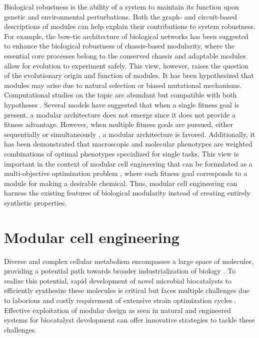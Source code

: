 Biological robustness is the ability of a system to maintain its function upon genetic and environmental perturbations.
Both the graph- and circuit-based descriptions of modules \citep{whitacre2012} can help explain their contributions to system robustness.
For example, the bow-tie architecture of biological networks \citep{friedlander2015} has been suggested \citep{kitano2004} to enhance the biological robustness of chassis-based modularity, where the essential core processes belong to the conserved chassis and adaptable modules allow for evolution to experiment safely.
This view, however, raises the question of the evolutionary origin and function of modules.
It has been hypothesized that modules may arise due to natural selection or biased mutational mechanisms.
Computational studies on the topic are abundant but compatible with both hypotheses \citep{wagner2007}.
Several models have suggested that when a single fitness goal is present, a modular architecture does not emerge since it does not provide a fitness advantage.
However, when multiple fitness goals are pursued, either sequentially \citep{kashtan2007} or simultaneously \citep{clune2013}, a modular architecture is favored.
Additionally, it has been demonstrated that macroscopic \citep{shoval2012} and molecular \citep{schuetz2012} phenotypes are weighted combinations of optimal phenotypes specialized for single tasks.
This view is important in the context of modular cell engineering that can be formulated as a multi-objective optimization problem \citep{garcia2019}, where each fitness goal corresponds to a module for making a desirable chemical.
Thus, modular cell engineering can harness the existing features of biological modularity instead of creating entirely synthetic properties.

\section{Modular cell engineering}

Diverse and complex cellular metabolism encompasses a large space of molecules, providing a potential path towards broader industrialization of biology \citep{connelly2015}.
To realize this potential, rapid development of novel microbial biocatalysts to efficiently synthesize these molecules is critical but faces multiple challenges due to laborious and costly requirement of extensive strain optimization cycles \citep{nielsen2016b, trinh2016}.
Effective exploitation of modular design as seen in natural and engineered systems for biocatalyst development can offer innovative strategies to tackle these challenges.

